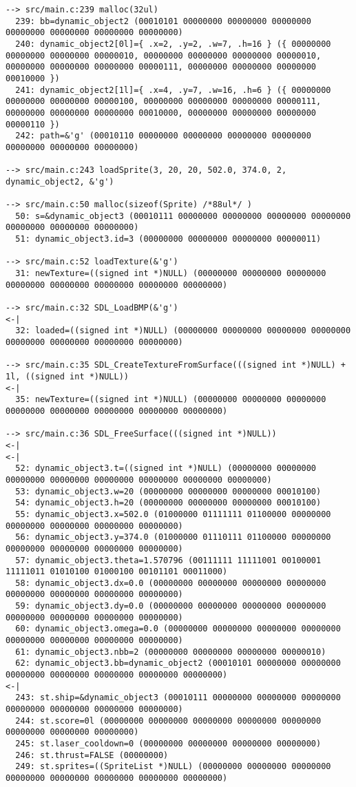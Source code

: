 \begin{verbatim}
--> src/main.c:239 malloc(32ul)
  239: bb=dynamic_object2 (00010101 00000000 00000000 00000000 00000000 00000000 00000000 00000000)
  240: dynamic_object2[0l]={ .x=2, .y=2, .w=7, .h=16 } ({ 00000000 00000000 00000000 00000010, 00000000 00000000 00000000 00000010, 00000000 00000000 00000000 00000111, 00000000 00000000 00000000 00010000 })
  241: dynamic_object2[1l]={ .x=4, .y=7, .w=16, .h=6 } ({ 00000000 00000000 00000000 00000100, 00000000 00000000 00000000 00000111, 00000000 00000000 00000000 00010000, 00000000 00000000 00000000 00000110 })
  242: path=&'g' (00010110 00000000 00000000 00000000 00000000 00000000 00000000 00000000)

--> src/main.c:243 loadSprite(3, 20, 20, 502.0, 374.0, 2, dynamic_object2, &'g')

--> src/main.c:50 malloc(sizeof(Sprite) /*88ul*/ )
  50: s=&dynamic_object3 (00010111 00000000 00000000 00000000 00000000 00000000 00000000 00000000)
  51: dynamic_object3.id=3 (00000000 00000000 00000000 00000011)

--> src/main.c:52 loadTexture(&'g')
  31: newTexture=((signed int *)NULL) (00000000 00000000 00000000 00000000 00000000 00000000 00000000 00000000)

--> src/main.c:32 SDL_LoadBMP(&'g')
<-|
  32: loaded=((signed int *)NULL) (00000000 00000000 00000000 00000000 00000000 00000000 00000000 00000000)

--> src/main.c:35 SDL_CreateTextureFromSurface(((signed int *)NULL) + 1l, ((signed int *)NULL))
<-|
  35: newTexture=((signed int *)NULL) (00000000 00000000 00000000 00000000 00000000 00000000 00000000 00000000)

--> src/main.c:36 SDL_FreeSurface(((signed int *)NULL))
<-|
<-|
  52: dynamic_object3.t=((signed int *)NULL) (00000000 00000000 00000000 00000000 00000000 00000000 00000000 00000000)
  53: dynamic_object3.w=20 (00000000 00000000 00000000 00010100)
  54: dynamic_object3.h=20 (00000000 00000000 00000000 00010100)
  55: dynamic_object3.x=502.0 (01000000 01111111 01100000 00000000 00000000 00000000 00000000 00000000)
  56: dynamic_object3.y=374.0 (01000000 01110111 01100000 00000000 00000000 00000000 00000000 00000000)
  57: dynamic_object3.theta=1.570796 (00111111 11111001 00100001 11111011 01010100 01000100 00101101 00011000)
  58: dynamic_object3.dx=0.0 (00000000 00000000 00000000 00000000 00000000 00000000 00000000 00000000)
  59: dynamic_object3.dy=0.0 (00000000 00000000 00000000 00000000 00000000 00000000 00000000 00000000)
  60: dynamic_object3.omega=0.0 (00000000 00000000 00000000 00000000 00000000 00000000 00000000 00000000)
  61: dynamic_object3.nbb=2 (00000000 00000000 00000000 00000010)
  62: dynamic_object3.bb=dynamic_object2 (00010101 00000000 00000000 00000000 00000000 00000000 00000000 00000000)
<-|
  243: st.ship=&dynamic_object3 (00010111 00000000 00000000 00000000 00000000 00000000 00000000 00000000)
  244: st.score=0l (00000000 00000000 00000000 00000000 00000000 00000000 00000000 00000000)
  245: st.laser_cooldown=0 (00000000 00000000 00000000 00000000)
  246: st.thrust=FALSE (00000000)
  249: st.sprites=((SpriteList *)NULL) (00000000 00000000 00000000 00000000 00000000 00000000 00000000 00000000)


\end{verbatim}
